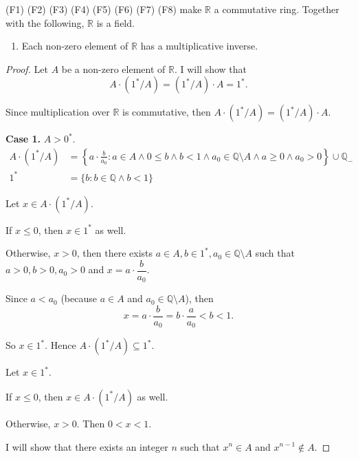 (F1) (F2) (F3) (F4) (F5) (F6) (F7) (F8) make $\mathbb{R}$ a commutative ring. Together with the following, $\mathbb{R}$ is a field.

\begin{theorem}\label{theorem:chapter1:multiplicative-inverse}
    \begin{enumerate}[label={(F\arabic*)},start=9]
        \item Each non-zero element of $\mathbb{R}$ has a multiplicative inverse.
    \end{enumerate}
\end{theorem}

\begin{proof}
    Let $A$ be a non-zero element of $\mathbb{R}$. I will show that
    \[
        A\cdot ({1}^{*}/A) = ({1}^{*}/A)\cdot A = {1}^{*}.
    \]

    Since multiplication over $\mathbb{R}$ is commutative, then $A\cdot ({1}^{*}/A) = ({1}^{*}/A)\cdot A$.

    \textbf{Case 1.} $A > {0}^{*}$.
    \[
        \begin{split}
            A\cdot ({1}^{*}/A) & = \left\{ a\cdot\frac{b}{a_{0}} : a\in A\land 0\le b\land b < 1\land a_{0}\in\mathbb{Q}\setminus A\land a\ge 0\land a_{0} > 0 \right\}\cup\mathbb{Q}_{-} \\
            {1}^{*} & = \{ b: b\in\mathbb{Q}\land b < 1 \}
        \end{split}
    \]

    Let $x\in A\cdot ({1}^{*}/A)$.

    If $x\le 0$, then $x\in {1}^{*}$ as well.

    Otherwise, $x > 0$, then there exists $a\in A, b\in {1}^{*}, a_{0}\in \mathbb{Q}\setminus A$ such that $a > 0, b > 0, a_{0} > 0$ and $x = a\cdot\dfrac{b}{a_{0}}$.

    Since $a < a_{0}$ (because $a\in A$ and $a_{0}\in\mathbb{Q}\setminus A$), then
    \[
        x = a\cdot\dfrac{b}{a_{0}} = b\cdot\dfrac{a}{a_{0}} < b < 1.
    \]

    So $x\in {1}^{*}$. Hence $A\cdot ({1}^{*}/A)\subseteq {1}^{*}$.

    \bigskip

    Let $x\in {1}^{*}$.

    If $x\le 0$, then $x\in A\cdot ({1}^{*}/A)$ as well.

    Otherwise, $x > 0$. Then $0 < x < 1$.

    I will show that there exists an integer $n$ such that $x^{n}\in A$ and $x^{n-1}\notin A$.


\end{proof}
